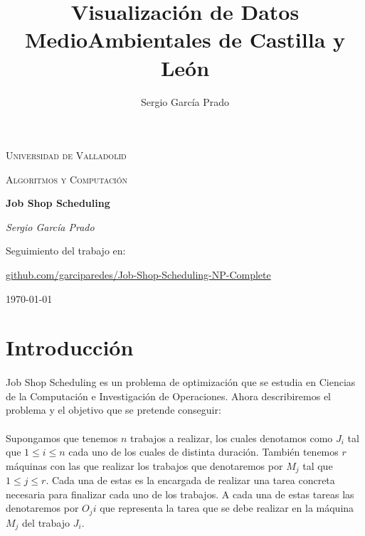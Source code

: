 \documentclass[11pt, a4paper,spanish]{article}
\title{Visualización de Datos MedioAmbientales de Castilla y León}
\author{Sergio García Prado}
\begin{document}
	\begin{titlepage}
		\centering
		{\scshape\LARGE Universidad de Valladolid \par}
		
		\vspace{1cm}
		{\scshape\Large Algoritmos y Computación\par}
		
		\vspace{1.5cm}
		{\huge\bfseries Job Shop Scheduling\par}
		
		\vspace{2cm}
		{\Large\itshape Sergio García Prado\par}

		\vfill
		Seguimiento del trabajo en: \par
		\href{https://github.com/garciparedes/Job-Shop-Scheduling-NP-Complete}{github.com/garciparedes/Job-Shop-Scheduling-NP-Complete}
		\vfill

		{\large \today\par}
	\end{titlepage}

	\newpage
		\tableofcontents
	\newpage
	
		\section{Introducción}
			
			\paragraph{}
			Job Shop Scheduling es un problema de optimización que se estudia en Ciencias de la Computación e Investigación de Operaciones. Ahora describiremos el problema y el objetivo que se pretende conseguir:
			
			\paragraph{}
			Supongamos que tenemos $n$ trabajos a realizar, los cuales denotamos como $J_{i}$ tal que $1 \leq i \leq n$ cada uno de los cuales de distinta duración. También tenemos $r$ máquinas con las que realizar los trabajos que denotaremos por $M_{j}$ tal que $1 \leq j \leq r$. Cada una de estas es la encargada de realizar una tarea concreta necesaria para finalizar cada uno de los trabajos. A cada una de estas tareas las denotaremos por  $O_{j}{i}$ que representa la tarea que se debe realizar en la máquina  $M_{j}$ del trabajo $J_{i}$.
\end{document}
